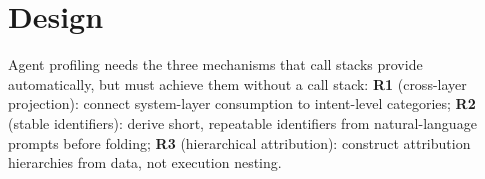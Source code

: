 \documentclass[sigconf,nonacm]{acmart}
\begin{document}
\section{Design}
\label{sec:design}

Agent profiling needs the three mechanisms that call stacks provide automatically, but must achieve them without a call stack:
\textbf{R1} (cross-layer projection): connect system-layer consumption to intent-level categories;
\textbf{R2} (stable identifiers): derive short, repeatable identifiers from natural-language prompts before folding;
\textbf{R3} (hierarchical attribution): construct attribution hierarchies from data, not execution nesting.
\end{document}
